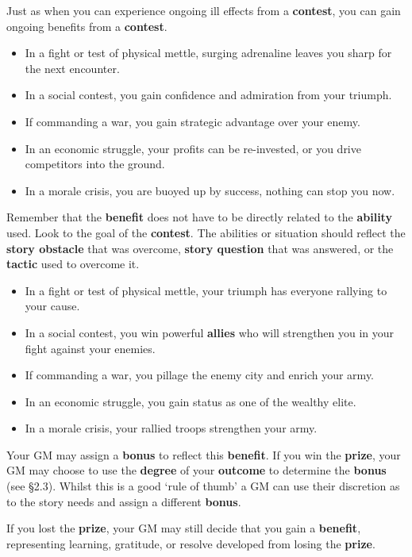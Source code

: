 \documentclass[
  11pt,
]{article}
\providecommand{\tightlist}{%
  \setlength{\itemsep}{0pt}\setlength{\parskip}{0pt}}
\begin{document}
Just as when you can experience ongoing ill effects from a
\textbf{contest}, you can gain ongoing benefits from a \textbf{contest}.

\begin{itemize}
\tightlist
\item
  In a fight or test of physical mettle, surging adrenaline leaves you
  sharp for the next encounter.
\item
  In a social contest, you gain confidence and admiration from your
  triumph.
\item
  If commanding a war, you gain strategic advantage over your enemy.
\item
  In an economic struggle, your profits can be re-invested, or you drive
  competitors into the ground.
\item
  In a morale crisis, you are buoyed up by success, nothing can stop you
  now.
\end{itemize}

Remember that the \textbf{benefit} does not have to be directly related
to the \textbf{ability} used. Look to the goal of the \textbf{contest}.
The abilities or situation should reflect the \textbf{story obstacle}
that was overcome, \textbf{story question} that was answered, or the
\textbf{tactic} used to overcome it.

\begin{itemize}
\tightlist
\item
  In a fight or test of physical mettle, your triumph has everyone
  rallying to your cause.
\item
  In a social contest, you win powerful \textbf{allies} who will
  strengthen you in your fight against your enemies.
\item
  If commanding a war, you pillage the enemy city and enrich your army.
\item
  In an economic struggle, you gain status as one of the wealthy elite.
\item
  In a morale crisis, your rallied troops strengthen your army.
\end{itemize}

Your GM may assign a \textbf{bonus} to reflect this \textbf{benefit}. If
you win the \textbf{prize}, your GM may choose to use the
\textbf{degree} of your \textbf{outcome} to determine the \textbf{bonus}
(see §2.3). Whilst this is a good `rule of thumb' a GM can use their
discretion as to the story needs and assign a different \textbf{bonus}.

If you lost the \textbf{prize}, your GM may still decide that you gain a
\textbf{benefit}, representing learning, gratitude, or resolve developed
from losing the \textbf{prize}.
\end{document}
